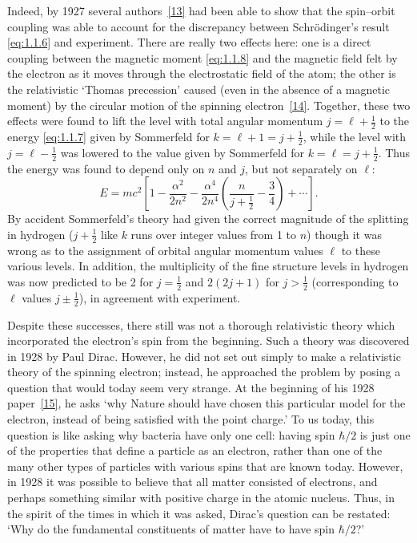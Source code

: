 Indeed, by 1927 several authors~\hyperref[ref:1.13]{[13]} had been able to show that the
spin--orbit coupling was able to account for the discrepancy between Schr\"odinger's result \eqref{eq:1.1.6} and experiment. There are really two effects here:
one is a direct coupling between the magnetic moment \eqref{eq:1.1.8} and the
magnetic field felt by the electron as it moves through the electrostatic
field of the atom; the other is the relativistic `Thomas precession' caused
(even in the absence of a magnetic moment) by the circular motion of
the spinning electron~\hyperref[ref:1.14]{[14]}. Together, these two effects were found to lift the
level with total angular momentum $j=\ell+\tfrac12$ to the energy \eqref{eq:1.1.7} given
by Sommerfeld for $k=\ell+1=j+\tfrac12$, while the level with $j=\ell-\tfrac12$ was
lowered to the value given by Sommerfeld for $k=\ell=j+\tfrac12$. Thus the
energy was found to depend only on $n$ and $j$, but not separately on $\ell$:
\begin{equation}
  E=mc^2\left[1-\frac{\alpha^2}{2n^2}
  -\frac{\alpha^4}{2n^4}\left(\frac{n}{j+\tfrac12}-\frac34\right)
  +\cdots\right].
  \tag{1.1.9}\label{eq:1.1.9}
\end{equation}
By accident Sommerfeld's theory had given the correct magnitude of the
splitting in hydrogen ($j+\tfrac12$ like $k$ runs over integer values from 1 to $n$)
though it was wrong as to the assignment of orbital angular momentum
values $\ell$ to these various levels. In addition, the multiplicity of the fine
structure levels in hydrogen was now predicted to be 2 for $j=\tfrac12$ and
$2(2j+1)$ for $j>\tfrac12$ (corresponding to $\ell$ values $j\pm\tfrac12$), in agreement with
experiment.

Despite these successes, there still was not a thorough relativistic theory
which incorporated the electron's spin from the beginning. Such a theory
was discovered in 1928 by Paul Dirac. However, he did not set out
simply to make a relativistic theory of the spinning electron; instead, he
approached the problem by posing a question that would today seem
very strange. At the beginning of his 1928 paper~\hyperref[ref:1.15]{[15]}, he asks `why Nature
should have chosen this particular model for the electron, instead of
being satisfied with the point charge.' To us today, this question is like
asking why bacteria have only one cell: having spin $\hbar/2$ is just one of
the properties that define a particle as an electron, rather than one of the
many other types of particles with various spins that are known today.
However, in 1928 it was possible to believe that all matter consisted
of electrons, and perhaps something similar with positive charge in the
atomic nucleus. Thus, in the spirit of the times in which it was asked,
Dirac's question can be restated: `Why do the fundamental constituents
of matter have to have spin $\hbar/2$?'

